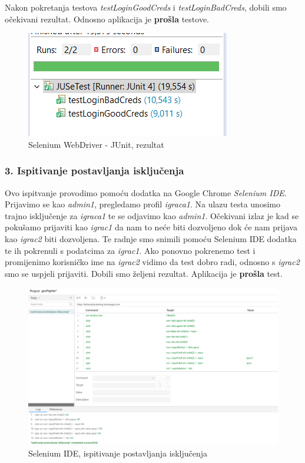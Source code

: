 				{Nakon pokretanja testova \emph{testLoginGoodCreds} i \emph{testLoginBadCreds}, dobili smo očekivani rezultat. Odnosno aplikacija je \textbf{prošla} testove.}
			
					\begin{figure}[H]
						\includegraphics[width=\textwidth]{slike/rezultat_JUSeTest} 
						\centering
						\caption{Selenium WebDriver - JUnit, rezultat}
						\label{}
					\end{figure}
				
			\subsubsection{3. Ispitivanje postavljanja isključenja}
			
				{Ovo ispitvanje provodimo pomoću dodatka na Google Chrome \emph{Selenium IDE}. Prijavimo se kao \emph{admin1}, pregledamo profil \emph{igraca1}. Na ulazu testa unosimo trajno isključenje za \emph{igraca1} te se odjavimo kao \emph{admin1}. Očekivani izlaz je kad se pokušamo prijaviti kao \emph{igrac1} da nam to neće biti dozvoljeno dok će nam prijava kao \emph{igrac2} biti dozvoljena. Te radnje smo snimili pomoću Selenium IDE dodatka te ih pokrenuli s podatcima za \emph{igrac1}. Ako ponovno pokrenemo test i promijenimo korisničko ime na \emph{igrac2} vidimo da test dobro radi, odnosno s \emph{igrac2} smo se uspjeli prijaviti. Dobili smo željeni rezultat. Aplikacija je \textbf{prošla} test.}
					
					\begin{figure}[H]
						\includegraphics[width=\textwidth]{slike/SeleniumIDE_test1} 
						\centering
						\caption{Selenium IDE, ispitivanje postavljanja isključenja}
						\label{}
					\end{figure}
				\eject
